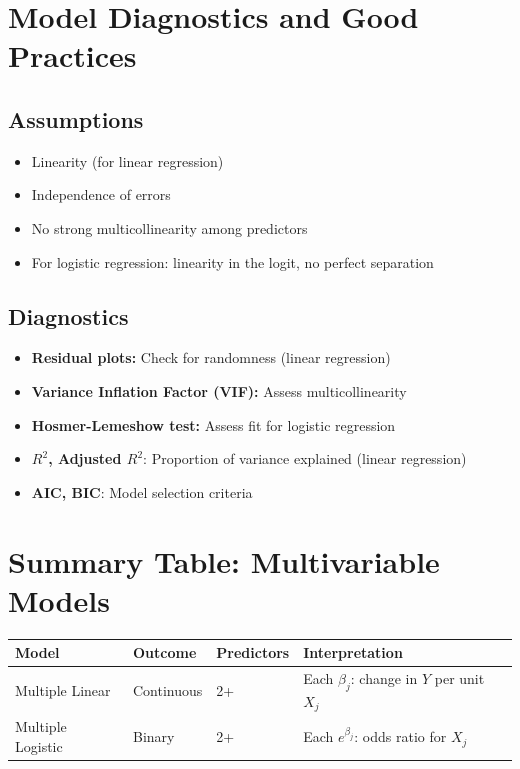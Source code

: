 \documentclass[11pt]{article}
\begin{document}
\section{Model Diagnostics and Good Practices}

\subsection{Assumptions}

\begin{itemize}
    \item Linearity (for linear regression)
    \item Independence of errors
    \item No strong multicollinearity among predictors
    \item For logistic regression: linearity in the logit, no perfect separation
\end{itemize}

\subsection{Diagnostics}

\begin{itemize}
    \item \textbf{Residual plots:} Check for randomness (linear regression)
    \item \textbf{Variance Inflation Factor (VIF):} Assess multicollinearity
    \item \textbf{Hosmer-Lemeshow test:} Assess fit for logistic regression
    \item \textbf{$R^2$, Adjusted $R^2$}: Proportion of variance explained (linear regression)
    \item \textbf{AIC, BIC}: Model selection criteria
\end{itemize}

\section{Summary Table: Multivariable Models}

\begin{tabular}{|l|l|l|l|}
\hline
\textbf{Model} & \textbf{Outcome} & \textbf{Predictors} & \textbf{Interpretation} \\
\hline
Multiple Linear & Continuous & 2+ & Each $\beta_j$: change in $Y$ per unit $X_j$ \\
Multiple Logistic & Binary & 2+ & Each $e^{\beta_j}$: odds ratio for $X_j$ \\
\hline
\end{tabular}
\end{document}
